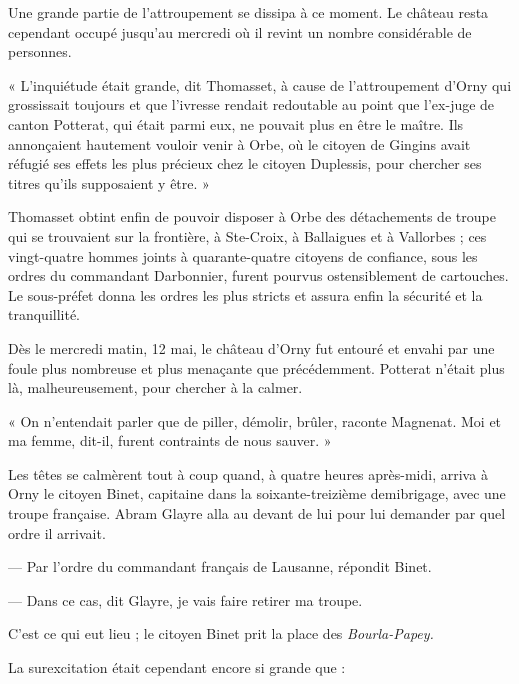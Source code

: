 \documentclass[french,twoside]{book} %
\newenvironment{quoteblock}%
  {\begin{quoting}}
  {\end{quoting}}
\newenvironment{quotebar}{%
    \def\FrameCommand{{\color{rubric!10!}\vrule width 0.5em} \hspace{0.9em}}%
    \def\OuterFrameSep{\itemsep} %
    \MakeFramed {\advance\hsize-\width \FrameRestore}
  }%
  {%
    \endMakeFramed
  }
\renewenvironment{quoteblock}%
  {%
    \savenotes
    \setstretch{0.9}
    \begin{quotebar}
  }
  {%
    \end{quotebar}
    \spewnotes
  }
\begin{document}
\noindent Une grande partie de l’attroupement se dissipa à ce moment. Le château resta cependant occupé jusqu’au mercredi où il revint un nombre considérable de personnes.\par

\begin{quoteblock}
 \noindent « L’inquiétude était grande, dit Thomasset, à cause de l’attroupement d’Orny qui grossissait toujours et que l’ivresse rendait redoutable au point que l’ex-juge de canton Potterat, qui était parmi eux, ne pouvait plus en être le maître. Ils annonçaient hautement vouloir venir à Orbe, où le citoyen de Gingins avait réfugié ses effets les plus précieux chez le citoyen Duplessis, pour chercher ses titres qu’ils supposaient y être. »
 \end{quoteblock}

\noindent Thomasset obtint enfin de pouvoir disposer à Orbe des détachements de troupe qui se trouvaient sur la frontière, à Ste-Croix, à Ballaigues et à Vallorbes ; ces vingt-quatre hommes joints à quarante-quatre citoyens de confiance, sous les ordres du commandant Darbonnier, furent pourvus ostensiblement de cartouches. Le sous-préfet donna les ordres les plus stricts et assura enfin la sécurité et la tranquillité.\par
Dès le mercredi matin, 12 mai, le château d’Orny fut entouré et envahi par une foule plus nombreuse et plus menaçante que précédemment. Potterat n’était plus là, malheureusement, pour chercher à la calmer.\par

\begin{quoteblock}
\noindent « On n’entendait parler que de piller, démolir, brûler, raconte Magnenat. Moi et ma femme, dit-il, furent contraints de nous sauver. »\end{quoteblock}

\noindent Les têtes se calmèrent tout à coup quand, à quatre heures après-midi, arriva à Orny le citoyen Binet, capitaine dans la soixante-treizième demibrigage, avec une troupe française. Abram Glayre alla au devant de lui pour lui demander par quel ordre il arrivait.\par
— Par l’ordre du commandant français de Lausanne, répondit Binet.\par
— Dans ce cas, dit Glayre, je vais faire retirer ma troupe.\par
C’est ce qui eut lieu ; le citoyen Binet prit la place des \emph{Bourla-Papey.}\par
La surexcitation était cependant encore si grande que :\par
\end{document}
